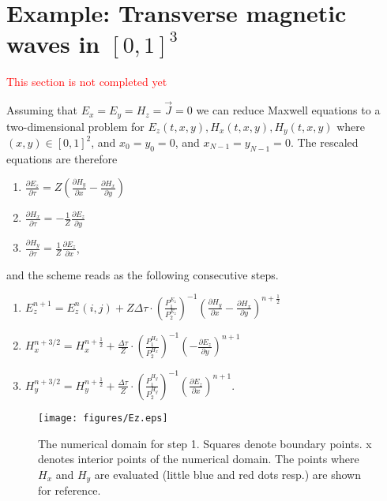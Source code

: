 \documentclass[12pt,reqno]{amsart}
\theoremstyle{definition}
\numberwithin{equation}{section}
\begin{document}
 

	

	\newpage
	\section{Example: Transverse magnetic waves  in $[0,1]^3$}\label{sec:TE}
	\textcolor{red}{This section is not completed yet}
	
	Assuming that $E_x=E_y=H_z=\vec{J}=0$ we can reduce Maxwell equations to a two-dimensional problem for $E_z(t,x,y), H_x(t,x,y), H_y(t,x,y)$ where  $(x,y)\in[0,1]^2$, and
	$x_0=y_0=0$, and $x_{N-1}=y_{N-1}=0$.
	The rescaled equations are therefore 
	
	\begin{enumerate}
		\item  $ \frac{\partial E_z}{\partial \tau }=Z\left (
		\frac{\partial H_y}{\partial x}-\frac{\partial H_x}{\partial y}
		\right)$
		\item 	  $ \frac{\partial H_x}{\partial \tau }=-\frac{1}{Z}\frac{\partial E_z}{\partial y}$
		\item 	  $ \frac{\partial H_y}{\partial \tau }=\frac{1}{Z}\frac{\partial E_z}{\partial x}$,
		
	\end{enumerate}
	and the scheme  reads as the following consecutive steps.
	\begin{enumerate}
		\item  $ E_z^{n+1}=E_z^n(i,j)+Z\Delta \tau \cdot 
		\left(\frac{P_1^{E_z}}{P_2^{E_z}}\right)^{-1}
		\left (\frac{\partial H_y}{\partial x}-
		\frac{\partial H_x}{\partial y}
		\right)^{n+\frac{1}{2}}$\\[1mm]
		\item $ H_x^{n+3/2}=H_x^{n+\frac{1}{2}}+\frac{\Delta \tau}{Z} \cdot  \left(\frac{P_1^{H_x}}{P_2^{H_x}}\right)^{-1}\left (-
		\frac{\partial E_z}{\partial y}
		\right)^{n+1} $\\[1mm]
		\item $ H_y^{n+3/2}=H_y^{n+\frac{1}{2}}+\frac{\Delta \tau}{Z} \cdot  \left(\frac{P_1^{H_y}}{P_2^{H_y}}\right)^{-1}\left (
		\frac{\partial E_z}{\partial x}
		\right)^{n+1} $.
	\end{enumerate}
	\begin{figure}[!t]
		\centering
		\texttt{[image: figures/Ez.eps]}
		\caption{
			The numerical domain for step 1.
			Squares denote boundary points. x denotes interior points of the numerical domain.  The points where $H_x$ and $H_y$ are evaluated (little blue and red dots resp.) are shown for reference.}
		\label{fig:E}
		
	\end{figure}
	
\end{document}
